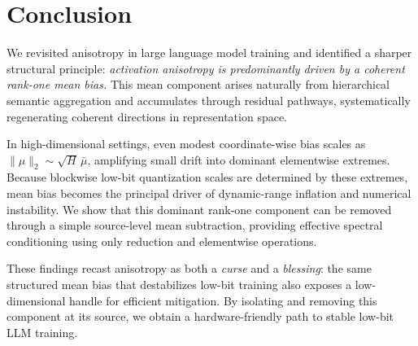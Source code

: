\section{Conclusion}
\label{sec:conclusion}

We revisited anisotropy in large language model training and identified a sharper structural principle:
\emph{activation anisotropy is predominantly driven by a coherent rank-one mean bias.}
This mean component arises naturally from hierarchical semantic aggregation
and accumulates through residual pathways,
systematically regenerating coherent directions in representation space.

In high-dimensional settings, even modest coordinate-wise bias scales as
$\|\mu\|_2 \sim \sqrt{H}\,\bar{\mu}$,
amplifying small drift into dominant elementwise extremes.
Because blockwise low-bit quantization scales are determined by these extremes,
mean bias becomes the principal driver of dynamic-range inflation and numerical instability.
We show that this dominant rank-one component can be removed through a simple
source-level mean subtraction,
providing effective spectral conditioning using only reduction and elementwise operations.

These findings recast anisotropy as both a \emph{curse} and a \emph{blessing}:
the same structured mean bias that destabilizes low-bit training
also exposes a low-dimensional handle for efficient mitigation.
By isolating and removing this component at its source,
we obtain a hardware-friendly path to stable low-bit LLM training.